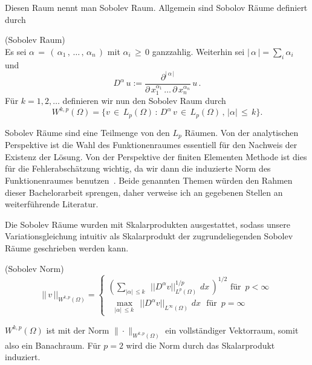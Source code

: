 Diesen Raum nennt man Sobolev Raum. Allgemein sind Sobolov Räume definiert durch

\begin{Definition} (Sobolev Raum) \\
Es sei $\alpha \, = \, ( \, \alpha_1 \, , \, \dots  \, , \, \alpha_n \, )$ mit $\alpha_i \, \geq \, 0$ ganzzahlig. Weiterhin sei $|\, \alpha \, |= \sum_i \alpha_i$ und
\begin{equation*}
D^{\alpha} \, u := \dfrac{ \partial^{| \, \alpha \,|} } {\partial \, x_1^{\alpha_1} \, \dots \, \partial \, x_n^{\alpha_n}} \, u \, .
\end{equation*}
Für $k=1,2,\dots$ definieren wir nun den Sobolev Raum durch
\begin{equation*}
W^{k,p} (\Omega) = \{ v \, \in  \, L_p (\Omega) \, : \, D^{\alpha} \, v \, \in \, L_p (\Omega) \, , \, | \alpha | \, \leq \, k \}.
\end{equation*}
\end{Definition}

Sobolev Räume sind eine Teilmenge von den $L_{p}$ Räumen.
Von der analytischen Perspektive ist die Wahl des Funktionenraumes essentiell für den Nachweis der Existenz der Lösung. Von der Perspektive der finiten Elementen Methode ist dies für die Fehlerabschätzung wichtig, da wir dann die induzierte Norm des Funktionenraumes benutzen~\cite[36]{Johnson}. Beide genannten Themen würden den Rahmen dieser Bachelorarbeit sprengen, daher verweise ich an gegebenen Stellen an weiterführende Literatur.

Die Sobolev Räume wurden mit Skalarprodukten ausgestattet, sodass unsere Variationsgleichung intuitiv als Skalarprodukt der zugrundeliegenden Sobolev Räume geschrieben werden kann.

\begin{Definition} (Sobolev Norm) \\
\begin{equation*}
|| \, v \, ||_{W^{k,p}(\Omega)} =
\begin{cases}
( \sum\limits_{|\alpha| \, \leq k \, } \, \, || D^{\alpha}v ||_{L^p(\Omega)}^{1/p} \, \, dx \, )^{1/2} \text{ für } \, p < \infty \\
 \, \, \, \max\limits_{|\alpha| \, \leq k \, } \, \, || D^{\alpha}v ||_{L^{\infty}(\Omega)} \, \, dx \,  \, \text{ für } \, p = \infty 
\end{cases}
\end{equation*}
\end{Definition}

$W^{{k,p}}(\Omega )$ ist mit der Norm $ \|{\cdot }\|_{{W^{{k,p}}(\Omega )}}$ ein vollständiger Vektorraum, somit also ein Banachraum.
Für $p=2$ wird die Norm durch das Skalarprodukt induziert.

